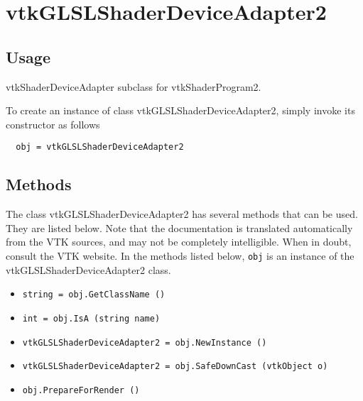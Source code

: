 \section{vtkGLSLShaderDeviceAdapter2}

\subsection{Usage}

 vtkShaderDeviceAdapter subclass for vtkShaderProgram2.

To create an instance of class vtkGLSLShaderDeviceAdapter2, simply
invoke its constructor as follows
\begin{verbatim}
  obj = vtkGLSLShaderDeviceAdapter2
\end{verbatim}
\subsection{Methods}

The class vtkGLSLShaderDeviceAdapter2 has several methods that can be used.
  They are listed below.
Note that the documentation is translated automatically from the VTK sources,
and may not be completely intelligible.  When in doubt, consult the VTK website.
In the methods listed below, \verb|obj| is an instance of the vtkGLSLShaderDeviceAdapter2 class.
\begin{itemize}
\item  \verb|string = obj.GetClassName ()|

\item  \verb|int = obj.IsA (string name)|

\item  \verb|vtkGLSLShaderDeviceAdapter2 = obj.NewInstance ()|

\item  \verb|vtkGLSLShaderDeviceAdapter2 = obj.SafeDownCast (vtkObject o)|

\item  \verb|obj.PrepareForRender ()|

\end{itemize}

